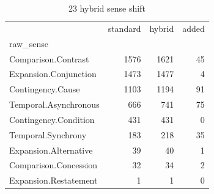 \begin{table}
\caption{23 hybrid sense shift}
\begin{tabular}{lrrr}
\toprule
 & standard & hybrid & added \\
raw_sense &  &  &  \\
\midrule
Comparison.Contrast & 1576 & 1621 & 45 \\
Expansion.Conjunction & 1473 & 1477 & 4 \\
Contingency.Cause & 1103 & 1194 & 91 \\
Temporal.Asynchronous & 666 & 741 & 75 \\
Contingency.Condition & 431 & 431 & 0 \\
Temporal.Synchrony & 183 & 218 & 35 \\
Expansion.Alternative & 39 & 40 & 1 \\
Comparison.Concession & 32 & 34 & 2 \\
Expansion.Restatement & 1 & 1 & 0 \\
\bottomrule
\end{tabular}
\end{table}
